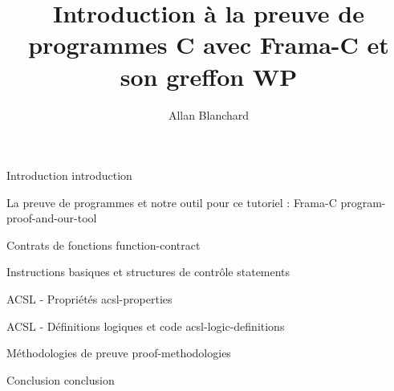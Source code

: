\documentclass[middle]{zmdocument}
\title{Introduction à la preuve de programmes C avec Frama-C et son greffon WP}
\author{Allan Blanchard}
\begin{document}
\maketitle
\tableofcontents

\begin{levelOne}
  {Introduction}
  {introduction}
\end{levelOne}

\begin{levelOne}
  {La preuve de programmes et notre outil pour ce tutoriel : Frama-C}
  {program-proof-and-our-tool}
\end{levelOne}

\begin{levelOne}
  {Contrats de fonctions}
  {function-contract}
\end{levelOne}

\begin{levelOne}
  {Instructions basiques et structures de contrôle}
  {statements}
\end{levelOne}

\begin{levelOne}
  {ACSL - Propriétés}
  {acsl-properties}
\end{levelOne}

\begin{levelOne}
  {ACSL - Définitions logiques et code}
  {acsl-logic-definitions}
\end{levelOne}

\begin{levelOne}
  {Méthodologies de preuve}
  {proof-methodologies}
\end{levelOne}

\begin{levelOne}
  {Conclusion}
  {conclusion}
\end{levelOne}
\end{document}

